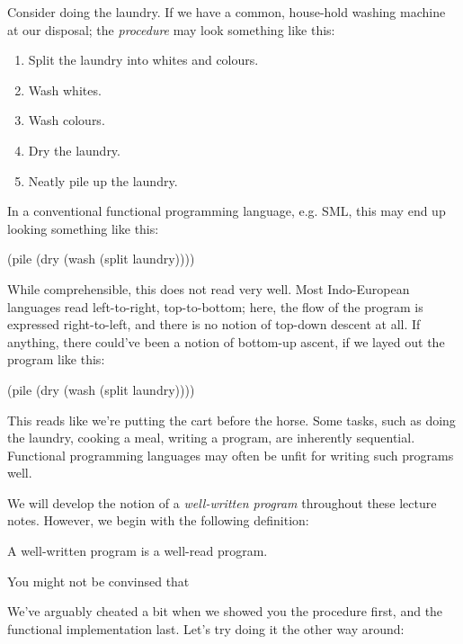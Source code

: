 Consider doing the laundry. If we have a common, house-hold washing machine at
our disposal; the {\it procedure} may look something like this:

\begin{enumerate}

\item Split the laundry into whites and colours.

\item Wash whites.

\item Wash colours.

\item Dry the laundry.

\item Neatly pile up the laundry.

\end{enumerate}

In a conventional functional programming language, e.g. SML, this may end up
looking something like this:

\begin{code}
(pile (dry (wash (split laundry))))
\end{code}

While comprehensible, this does not read very well. Most Indo-European
languages read left-to-right, top-to-bottom; here, the flow of the program is
expressed right-to-left, and there is no notion of top-down descent at all. If
anything, there could've been a notion of bottom-up ascent, if we layed out the
program like this:

\begin{code}
(pile
  (dry
    (wash
      (split laundry))))
\end{code}

This reads like we're putting the cart before the horse. Some tasks, such as
doing the laundry, cooking a meal, writing a program, are inherently
sequential. Functional programming languages may often be
 unfit for writing such
programs well.

We will develop the notion of a {\it well-written program} throughout these
lecture notes. However, we begin with the following definition:

\begin{definition}
A well-written program is a well-read program.
\end{definition}

You might not be convinsed that 

We've arguably cheated a bit when we showed you the procedure first, and the
functional implementation last. Let's try doing it the other way around:
